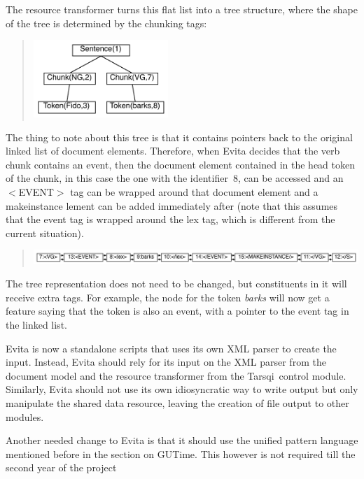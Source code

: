 \documentclass[11pt]{article}
\newcommand{\tarsqi}{T{\sc arsqi}}
\newcommand{\tag}[1]{$<$#1$>$}
\begin{document}
The resource transformer turns this flat list into a tree structure, where the shape of the tree is determined by the chunking tags: 

\begin{quote}
\includegraphics[width=2.0in]{images/doc_resource2.pdf} 
\end{quote}

The thing to note about this tree is that it contains pointers back to the original linked list of document elements. Therefore, when Evita decides that the verb chunk contains an event, then the document element contained in the head token of the chunk, in this case the one with the identifier~8, can be accessed and an \tag{EVENT} tag can be wrapped around that document element and a makeinstance lement can be added immediately after (note that this assumes that the event tag is wrapped around the lex tag, which is different from the current situation).

\begin{quote}
\includegraphics[width=6.0in]{images/doc_resource3.pdf} 
\end{quote}

The tree representation does not need to be changed, but constituents in it will receive extra tags. For example, the node for the token {\em barks} will now get a feature saying that the token is also an event, with a pointer to the event tag in the linked list.

\medskip\noindent
Evita is now a standalone scripts that uses its own XML parser to create the input. Instead, Evita should rely for its input on the XML parser from the document model and the resource transformer from the \tarsqi\ control module. Similarly, Evita should not use its own idiosyncratic way to write output but only manipulate the shared data resource, leaving the creation of file output to other modules.

Another needed change to Evita is that it should use the unified pattern language mentioned before in the section on GUTime. This however is not required till the second year of the project
\end{document}
